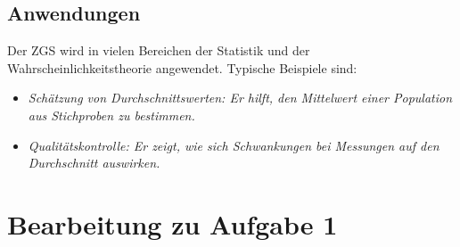 \documentclass{article}
\begin{document}
\subsection{Anwendungen}

Der ZGS wird in vielen Bereichen der Statistik und der Wahrscheinlichkeitstheorie angewendet. Typische Beispiele sind:

\begin{itemize}
    \item \textit{Schätzung von Durchschnittswerten: Er hilft, den Mittelwert einer Population aus Stichproben zu bestimmen.}
    \item \textit{Qualitätskontrolle: Er zeigt, wie sich Schwankungen bei Messungen auf den Durchschnitt auswirken.}
\end{itemize}

\newpage
\section{Bearbeitung zu Aufgabe 1}
\end{document}
